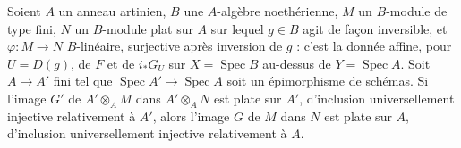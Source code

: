 \begin{encadre}
\begin{theoreme*}
Soient $A$ un anneau artinien, $B$ une $A$-algèbre noethérienne, $M$ un $B$-module de type fini, $N$ un $B$-module plat sur $A$ sur lequel $g \in B$ agit de façon inversible, et $\varphi : M \to N$ $B$-linéaire, surjective après inversion de $g$ : c'est la donnée affine, pour $U = D(g)$, de $F$ et de $i_*G_U$ sur $X = \operatorname{Spec} B$ au-dessus de $Y = \operatorname{Spec} A$. Soit $A \to A'$ fini tel que $\operatorname{Spec} A' \to \operatorname{Spec} A$ soit un épimorphisme de schémas. Si l'image $G'$ de $A' \otimes_A M$ dans $A' \otimes_A N$ est plate sur $A'$, d'inclusion universellement injective relativement à $A'$, alors l'image $G$ de $M$ dans $N$ est plate sur $A$, d'inclusion universellement injective relativement à $A$.
\end{theoreme*}
\end{encadre}
